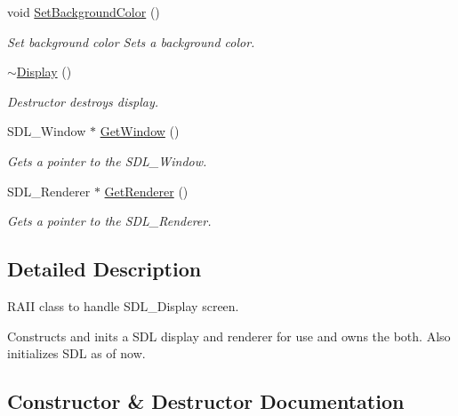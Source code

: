 \begin{DoxyCompactItemize}
\mbox{\label{classinferno_1_1graphics_1_1_display_a069358cb752031b94ff7a8439aa5ccd3}} 
void \mbox{\hyperlink{classinferno_1_1graphics_1_1_display_a069358cb752031b94ff7a8439aa5ccd3}{Set\+Background\+Color}} ()
\begin{DoxyCompactList}\small\item\em Set background color Sets a background color. \end{DoxyCompactList}\item 
\mbox{\label{classinferno_1_1graphics_1_1_display_a4dacb6972222af9e140aa3c71ce05190}} 
\mbox{\hyperlink{classinferno_1_1graphics_1_1_display_a4dacb6972222af9e140aa3c71ce05190}{$\sim$\+Display}} ()
\begin{DoxyCompactList}\small\item\em Destructor destroys display. \end{DoxyCompactList}\item 
S\+D\+L\+\_\+\+Window $\ast$ \mbox{\hyperlink{classinferno_1_1graphics_1_1_display_ae3eda38c23eae8e2d49bfab0ef3e2f6c}{Get\+Window}} ()
\begin{DoxyCompactList}\small\item\em Gets a pointer to the S\+D\+L\+\_\+\+Window. \end{DoxyCompactList}\item 
S\+D\+L\+\_\+\+Renderer $\ast$ \mbox{\hyperlink{classinferno_1_1graphics_1_1_display_a6b2bd638d5f6b07b4a5cfad4a04fab41}{Get\+Renderer}} ()
\begin{DoxyCompactList}\small\item\em Gets a pointer to the S\+D\+L\+\_\+\+Renderer. \end{DoxyCompactList}\end{DoxyCompactItemize}


\subsection{Detailed Description}
R\+A\+II class to handle S\+D\+L\+\_\+\+Display screen. 

Constructs and inits a S\+DL display and renderer for use and owns the both. Also initializes S\+DL as of now. 

\subsection{Constructor \& Destructor Documentation}
\mbox{\label{classinferno_1_1graphics_1_1_display_a8209b018b72b97990c10e67054ef813e}} 
